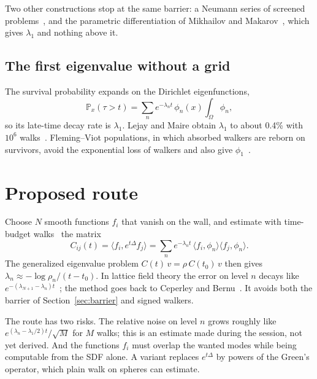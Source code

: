 \documentclass{article}
\begin{document}
Two other constructions stop at the same barrier: a Neumann series of screened problems~\cite{bernal2023}, and the parametric differentiation of Mikhailov and Makarov~\cite{mikhailov1998}, which gives $\lambda_1$ and nothing above it.

\subsection{The first eigenvalue without a grid}
The survival probability expands on the Dirichlet eigenfunctions,
\begin{equation}
\mathbb P_x(\tau>t)=\sum_n e^{-\lambda_n t}\,\phi_n(x)\int_\Omega\phi_n ,
\end{equation}
so its late-time decay rate is $\lambda_1$. Lejay and Maire obtain $\lambda_1$ to about 0.4\% with $10^6$ walks~\cite{lejay2007}. Fleming--Viot populations, in which absorbed walkers are reborn on survivors, avoid the exponential loss of walkers and also give $\phi_1$~\cite{burdzy1996,villemonais2011}.

\section{Proposed route}
\label{sec:route}
Choose $N$ smooth functions $f_i$ that vanish on the wall, and estimate with time-budget walks~\cite{zhou2026} the matrix
\begin{equation}
C_{ij}(t)=\langle f_i,e^{t\Delta}f_j\rangle=\sum_n e^{-\lambda_n t}\,\langle f_i,\phi_n\rangle\langle f_j,\phi_n\rangle .
\label{eq:corr}
\end{equation}
The generalized eigenvalue problem $C(t)\,v=\rho\,C(t_0)\,v$ then gives $\lambda_n\approx-\log\rho_n/(t-t_0)$. In lattice field theory the error on level $n$ decays like $e^{-(\lambda_{N+1}-\lambda_n)t}$~\cite{blossier2009}; the method goes back to Ceperley and Bernu~\cite{ceperley1988}. It avoids both the barrier of Section~\ref{sec:barrier} and signed walkers.

The route has two risks. The relative noise on level $n$ grows roughly like $e^{(\lambda_n-\lambda_1/2)t}/\sqrt M$ for $M$ walks; this is an estimate made during the session, not yet derived. And the functions $f_i$ must overlap the wanted modes while being computable from the SDF alone. A variant replaces $e^{t\Delta}$ by powers of the Green's operator, which plain walk on spheres can estimate.
\end{document}
